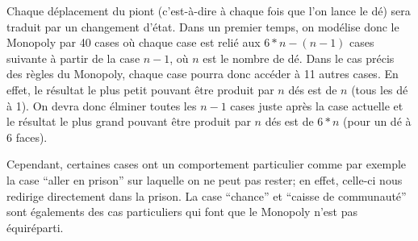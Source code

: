 \documentclass[letterpaper]{article}
\newcommand{\colornode}[1][]{\node[state,
	    align=center,
	    text=gray!40!black,
	    draw=gray,
	    fill=gray!20!white,{#1}]}
\newcommand{\drawedge}{\draw[every loop, line width=0.4mm, fill=gray, draw=gray]}
\begin{document}
    Chaque déplacement du piont (c'est-à-dire à chaque fois que l'on lance le dé) sera 
    traduit par un changement d'état.
    Dans un premier temps, on modélise donc le Monopoly par 40 cases où chaque case est
    relié aux $6*n-(n-1)$ cases suivante à partir de la case $n-1$, où $n$ est le 
    nombre de dé.  Dans le cas précis des règles du Monopoly, chaque case pourra 
    donc accéder à 11 autres cases.  En effet, le résultat le plus petit pouvant être 
    produit par $n$ dés est de $n$ (tous les dé à 1).
    On devra donc élminer toutes les $n-1$ cases juste après la case actuelle et le résultat
    le plus grand pouvant être produit par $n$ dés est de $6*n$ (pour un dé à 6 faces).
    \begin{center}
    \end{center}
    Cependant, certaines cases ont un comportement particulier comme
    par exemple la case ``aller en prison'' sur laquelle on ne peut pas rester; en effet,
    celle-ci nous redirige directement dans la prison.  La case ``chance'' et ``caisse de
    communauté'' sont égalements des cas particuliers qui font que le Monopoly n'est pas 
    équiréparti.
    
\end{document}
